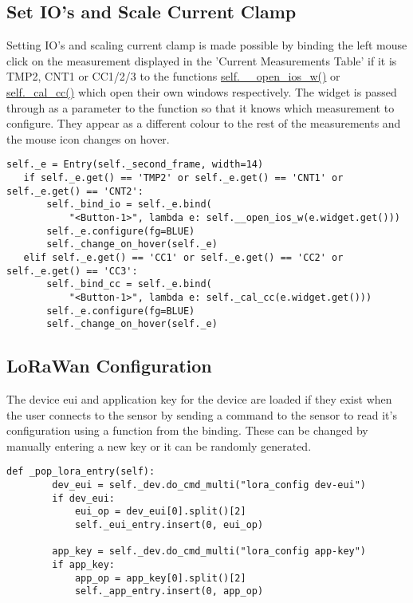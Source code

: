 \documentclass[a4paper,12pt, notitlepage]{article}
\begin{document}
\subsection{Set IO's and Scale Current Clamp}

Setting IO's and scaling current clamp is made possible by binding the left mouse click on the measurement displayed in the 'Current Measurements Table' if it is TMP2, CNT1 or CC1/2/3 to the functions \url{self.__open_ios_w()} or \url{self._cal_cc()} which open their own windows respectively. The widget is passed through as a parameter to the function so that it knows which measurement to configure. They appear as a different colour to the rest of the measurements and the mouse icon changes on hover.

\begin{lstlisting}[caption={A function to set pulsecount or one wire.},label={lst: exampIoSet}]
   self._e = Entry(self._second_frame, width=14)
   if self._e.get() == 'TMP2' or self._e.get() == 'CNT1' or self._e.get() == 'CNT2':
       self._bind_io = self._e.bind(
           "<Button-1>", lambda e: self.__open_ios_w(e.widget.get()))
       self._e.configure(fg=BLUE)
       self._change_on_hover(self._e)
   elif self._e.get() == 'CC1' or self._e.get() == 'CC2' or self._e.get() == 'CC3':
       self._bind_cc = self._e.bind(
           "<Button-1>", lambda e: self._cal_cc(e.widget.get()))
       self._e.configure(fg=BLUE)
       self._change_on_hover(self._e)
\end{lstlisting}

\subsection{LoRaWan Configuration}

The device eui and application key for the device are loaded if they exist when the user connects to the sensor by sending a command to the sensor to read it's configuration using a function from the binding. These can be changed by manually entering a new key or it can be randomly generated.

\begin{lstlisting}[caption={Reading the dev-eui and app-key and inserting into an entry box.},label={lst: exampLoraSet}]
    def _pop_lora_entry(self):
        dev_eui = self._dev.do_cmd_multi("lora_config dev-eui")
        if dev_eui:
            eui_op = dev_eui[0].split()[2]
            self._eui_entry.insert(0, eui_op)

        app_key = self._dev.do_cmd_multi("lora_config app-key")
        if app_key:
            app_op = app_key[0].split()[2]
            self._app_entry.insert(0, app_op)
\end{lstlisting}
\end{document}
